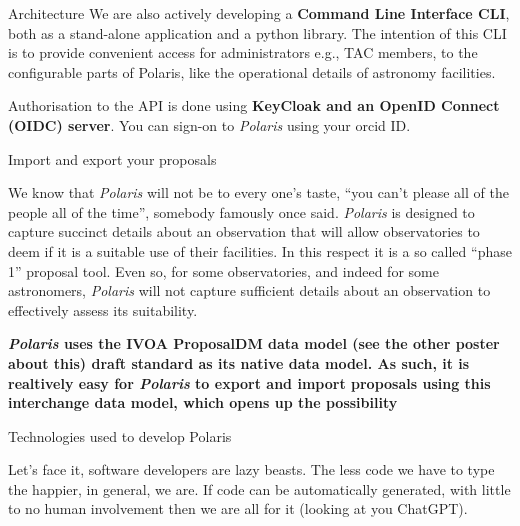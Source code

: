 \documentclass[final]{beamer}
\newlength{\colwidth}
\begin{document}
\begin{frame}[t]
\begin{columns}[t]
\begin{column}{\colwidth}
\begin{block}{Architecture}
                    We are also actively developing a \textbf{Command Line Interface CLI}, both as a stand-alone application and
                    a python library. The intention of this CLI is to provide convenient access
                    for administrators e.g., TAC members, to the configurable parts of Polaris, like the operational
                    details of astronomy facilities.

                    Authorisation to the API is done using \textbf{KeyCloak and an OpenID Connect (OIDC) server}.
                    You can sign-on to \emph{Polaris} using your orcid ID\@.

                \end{block}

                \begin{alertblock}{Import and export your proposals}

                    We know that \emph{Polaris} will not be to every one's taste,
                    ``you can't please all of the people all of the time'', somebody famously once said.
                    \emph{Polaris} is designed to capture succinct details about an observation
                    that will allow observatories to deem if it is a suitable use of their facilities.
                    In this respect it is a so called ``phase 1'' proposal tool.
                    Even so, for some observatories, and indeed for some astronomers, \emph{Polaris} will not
                    capture sufficient details about an observation to effectively assess its suitability.

                    \textbf{\emph{Polaris} uses the IVOA ProposalDM data model (see the other poster about this)  draft standard as its native data model.
                        As such, it is realtively easy for \emph{Polaris} to export and import proposals using this interchange data model, which opens up
                    the possibility
                    }

                \end{alertblock}

                \begin{block}{Technologies used to develop Polaris}

                    Let's face it, software developers are lazy beasts.
                    The less code we have to type the happier, in general, we are.
                    If code can be automatically generated, with little to no human involvement then we are
                    all for it (looking at you ChatGPT).


\end{block}
\end{column}
\end{columns}
\end{frame}
\end{document}
